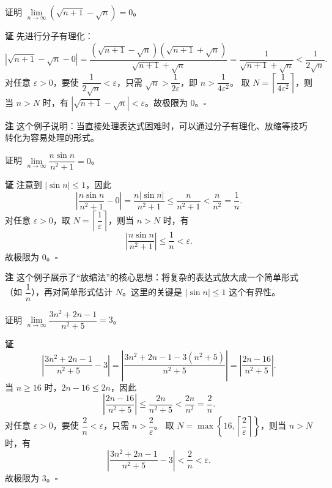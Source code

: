 \documentclass{ctexart}
\newenvironment{custom}[1]{\par\noindent \textbf{#1}\quad}{\par\vspace{1em}}
\begin{document}
\begin{example}
证明 \(\lim\limits_{n\to\infty} \left(\sqrt{n+1} - \sqrt{n}\right) = 0\)。
\end{example}
\begin{custom}{证}
先进行分子有理化：
\[
\left|\sqrt{n+1} - \sqrt{n} - 0\right| = \dfrac{(\sqrt{n+1} - \sqrt{n})(\sqrt{n+1} + \sqrt{n})}{\sqrt{n+1} + \sqrt{n}} = \dfrac{1}{\sqrt{n+1} + \sqrt{n}} < \dfrac{1}{2\sqrt{n}}.
\]
对任意 \(\varepsilon > 0\)，要使 \(\dfrac{1}{2\sqrt{n}} < \varepsilon\)，只需 \(\sqrt{n} > \dfrac{1}{2\varepsilon}\)，即 \(n > \dfrac{1}{4\varepsilon^2}\)。
取 \(N = \left\lceil \dfrac{1}{4\varepsilon^2} \right\rceil\)，则当 \(n > N\) 时，有 \(\left|\sqrt{n+1} - \sqrt{n}\right| < \varepsilon\)。故极限为 0。\(\square\)
\end{custom}

\begin{custom}{注}
这个例子说明：当直接处理表达式困难时，可以通过分子有理化、放缩等技巧转化为容易处理的形式。
\end{custom}

\begin{example}
证明 \(\lim\limits_{n\to\infty} \dfrac{n \sin n}{n^2 + 1} = 0\)。
\end{example}
\begin{custom}{证}
注意到 \(|\sin n| \leq 1\)，因此
\[
\left|\dfrac{n \sin n}{n^2 + 1} - 0\right| = \dfrac{n |\sin n|}{n^2 + 1} \leq \dfrac{n}{n^2 + 1} < \dfrac{n}{n^2} = \dfrac{1}{n}.
\]
对任意 \(\varepsilon > 0\)，取 \(N = \left\lceil \dfrac{1}{\varepsilon} \right\rceil\)，则当 \(n > N\) 时，有
\[
\left|\dfrac{n \sin n}{n^2 + 1}\right| \leq \dfrac{1}{n} < \varepsilon.
\]
故极限为 0。\(\square\)
\end{custom}

\begin{custom}{注}
这个例子展示了“放缩法”的核心思想：将复杂的表达式放大成一个简单形式（如 \(\dfrac{1}{n}\)），再对简单形式估计 \(N\)。这里的关键是 \(|\sin n| \leq 1\) 这个有界性。
\end{custom}

\begin{example}证明 \(\lim\limits_{n\to\infty} \dfrac{3n^2 + 2n - 1}{n^2 + 5} = 3\)。
\end{example}
\begin{custom}{证}
\[
\left|\dfrac{3n^2 + 2n - 1}{n^2 + 5} - 3\right| = \left|\dfrac{3n^2 + 2n - 1 - 3(n^2 + 5)}{n^2 + 5}\right| = \left|\dfrac{2n - 16}{n^2 + 5}\right|.
\]
当 \(n \geq 16\) 时，\(2n - 16 \leq 2n\)，因此
\[
\left|\dfrac{2n - 16}{n^2 + 5}\right| \leq \dfrac{2n}{n^2 + 5} < \dfrac{2n}{n^2} = \dfrac{2}{n}.
\]
对任意 \(\varepsilon > 0\)，要使 \(\dfrac{2}{n} < \varepsilon\)，只需 \(n > \dfrac{2}{\varepsilon}\)。
取 \(N = \max\left\{16, \left\lceil \dfrac{2}{\varepsilon} \right\rceil\right\}\)，则当 \(n > N\) 时，有
\[
\left|\dfrac{3n^2 + 2n - 1}{n^2 + 5} - 3\right| < \dfrac{2}{n} < \varepsilon.
\]
故极限为 3。\(\square\)
\end{custom}
\end{document}
